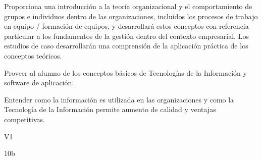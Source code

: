 \begin{syllabus}


\begin{justification}
Proporciona una introducción a la teoría organizacional y el comportamiento de grupos e individuos dentro de las organizaciones, incluidos los 
procesos de trabajo en equipo / formación de equipos, y desarrollará estos conceptos con referencia particular a los fundamentos de la gestión dentro del contexto empresarial. Los estudios de caso desarrollarán una comprensión de la aplicación práctica de los conceptos teóricos.
\end{justification}

\begin{goals}
\item Proveer al alumno de los conceptos básicos de Tecnologías de la Información y software de aplicación.
\item Entender como la información es utilizada en las organizaciones y como la Tecnología de la Información permite aumento de calidad y ventajas competitivas.
\end{goals}

\begin{outcomes}{V1}
   \item {}
   \item {}
   \item {}
   \item {}
   \item {}
   \item {}
   \item {}
   \item {}
\end{outcomes}

\begin{unit}{\LUFIVEDef}{}{\LUFIVEBib}{10}{b}
   \begin{topics}
      \item \OMCTWOTopicTWOxTWOxONEOH
      \item \TDSONETopicTHREExONExONE
      \item \TDSONETopicTHREExONExTWO
      \item \TDSONETopicTHREExONExTHREE
      \item \TDSONETopicTHREExONExFOUR
      \item \TDSONETopicTHREExONExFIVE
   \end{topics}
	\LUFIVEGoal
\end{unit}

\begin{coursebibliography}
\end{coursebibliography}

\end{syllabus}
